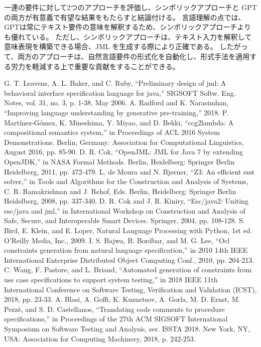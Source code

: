 \documentclass[uplatex, twocolumn,10pt]{jsarticle} %
\begin{document}
一連の要件に対して2つのアプローチを評価し、シンボリックアプローチと GPT の両方が有意義で有望な結果をもたらすと結論付ける。
言語理解の点では、GPTは常にテキスト要件の意味を解釈するため、シンボリックアプローチよりも優れている。
ただし、シンボリックアプローチは、テキスト入力を解釈して意味表現を構築できる場合、JML を生成する際により正確である。
したがって、両方のアプローチは、自然言語要件の形式化を自動化し、形式手法を適用する労力を軽減する上で重要な貢献をすることができる。

\begin{thebibliography}{99}
     G. T. Leavens, A. L. Baker, and C. Ruby, “Preliminary design of jml: A behavioral interface specification language for java,” SIGSOFT Softw. Eng. Notes, vol. 31, no. 3, p. 1-38, May 2006.
     A. Radford and K. Narasimhan, “Improving language understanding by generative pre-training,” 2018.
     P. Mart\'{i}nez-G\'{o}mez, K. Mineshima, Y. Miyao, and D. Bekki, “ccg2lambda: A compositional semantics system,” in Proceedings of ACL 2016 System Demonstrations. Berlin, Germany: Association for Computational Linguistics, August 2016, pp. 85-90.
     D. R. Cok, “OpenJML: JML for Java 7 by extending OpenJDK,” in NASA Formal Methods. Berlin, Heidelberg: Springer Berlin Heidelberg, 2011, pp. 472-479.
     L. de Moura and N. Bjørner, “Z3: An efficient smt solver,” in Tools and Algorithms for the Construction and Analysis of Systems, C. R. Ramakrishnan and J. Rehof, Eds. Berlin, Heidelberg: Springer Berlin Heidelberg, 2008, pp. 337-340.
     D. R. Cok and J. R. Kiniry, “Esc/java2: Uniting esc/java and jml,” in International Workshop on Construction and Analysis of Safe, Secure, and Interoperable Smart Devices. Springer, 2004, pp. 108-128.
     S. Bird, E. Klein, and E. Loper, Natural Language Processing with Python, 1st ed. O'Reilly Media, Inc., 2009.
     I. S. Bajwa, B. Bordbar, and M. G. Lee, “Ocl constraints generation from natural language specification,” in 2010 14th IEEE International Enterprise Distributed Object Computing Conf., 2010, pp. 204-213.
     C. Wang, F. Pastore, and L. Briand, “Automated generation of constraints from use case specifications to support system testing,” in 2018 IEEE 11th International Conference on Software Testing, Verification and Validation (ICST), 2018, pp. 23-33.
     A. Blasi, A. Goffi, K. Kuznetsov, A. Gorla, M. D. Ernst, M. Pezz\`{e}, and S. D. Castellanos, “Translating code comments to procedure specifications,” in Proceedings of the 27th ACM SIGSOFT International Symposium on Software Testing and Analysis, ser. ISSTA 2018. New York, NY, USA: Association for Computing Machinery, 2018, p. 242-253.

\end{thebibliography}
\end{document}
